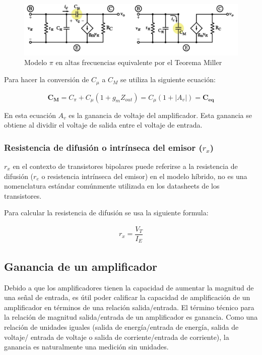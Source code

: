 \begin{figure}[H]
    \centering
    \includegraphics[width=\textwidth]{Imagenes/teorema_miller.jpg}
    \caption{Modelo $\pi$ en altas frecuencias equivalente por el Teorema Miller}
    \label{fig:miller}
\end{figure}

Para hacer la conversión de $C_{\mu}$ a $C_M$ se utiliza la siguiente ecuación:

\begin{equation}
    \mathbf{C_M} =  C_{\pi} + C_{\mu}(1+g_mZ_{out}) = C_{\mu}(1+|A_v|) = \mathbf{C_{eq}} \label{eqn:C_eq}
\end{equation}

En esta ecuación $A_v$ es la ganancia de voltaje del amplificador. Esta ganancia se obtiene al dividir el voltaje de salida entre el voltaje de entrada.

\subsubsection{Resistencia de difusión o intrínseca del emisor ($r_x$)}

$r_x$ en el contexto de transistores bipolares puede referirse a la resistencia de difusión ($r_e$ o resistencia intrínseca del emisor) en el modelo híbrido, no es una nomenclatura estándar comúnmente utilizada en los datasheets de los transistores.

Para calcular la resistencia de difusión se usa la siguiente formula:

\begin{gather}
    r_x=\dfrac{V_T}{I_{E}} \label{eqn:rx}
\end{gather}



\subsection{Ganancia de un amplificador}

Debido a que los amplificadores tienen la capacidad de aumentar la magnitud de una señal de entrada, es útil poder calificar la capacidad de amplificación de un amplificador en términos de una relación salida/entrada. El término técnico para la relación de magnitud salida/entrada de un amplificador es ganancia. Como una relación de unidades iguales (salida de energía/entrada de energía, salida de voltaje/ entrada de voltaje o salida de corriente/entrada de corriente), la ganancia es naturalmente una medición sin unidades.


